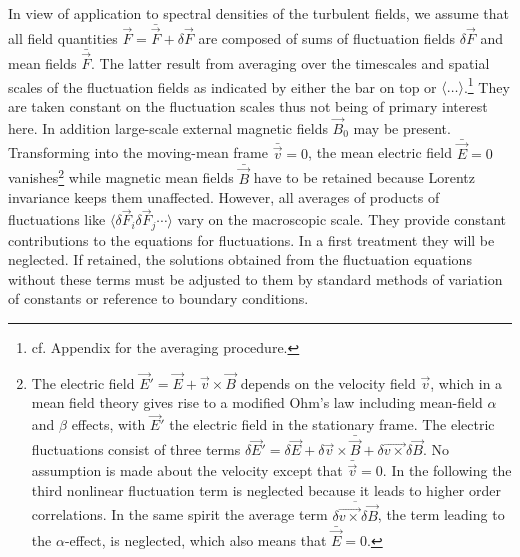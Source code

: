 \documentclass[ ]{copernicus2}
\begin{document}
{In view of application to spectral densities of the turbulent fields, we assume that all field quantities $\vec{F}=\bar{\vec{F}}+\delta\vec{F}$ are composed of sums of fluctuation fields $\delta\vec{F}$ and mean fields $\bar{\vec{F}}$. The latter result from averaging over the timescales and spatial scales of the fluctuation fields as indicated by either the bar on top or $\langle\dots\rangle$.\footnote{{cf. Appendix  for the averaging procedure.}}  They are taken constant on the fluctuation scales thus not being of primary interest here. In addition large-scale external magnetic fields $\vec{B}_0$ may be present. Transforming into the moving-mean frame $\bar{\vec{v}}=0$, the mean electric field $\bar{\vec{E}}=0$ vanishes\footnote{{The electric field $\vec{E}'=\vec{E}+\vec{v}\times\vec{B}$ depends on the velocity field $\vec{v}$, which in a mean field theory gives rise to a modified Ohm's law including mean-field $\alpha$ and $\beta$ effects, with $\vec{E}'$ the electric field in the stationary frame. The electric fluctuations consist of three terms $\delta\vec{E}'=\delta\vec{E}+\delta\vec{v}\times\bar{\vec{B}}+\delta\vec{v\times}\delta\vec{B}$. No assumption is made about the velocity except that $\bar{\vec{v}}=0$. In the following the third nonlinear fluctuation term is neglected because it leads to higher order correlations. In the same spirit the average term $\overline{\delta\vec{v\times}\delta\vec{B}}$, the term leading to the $\alpha$-effect, is neglected, which also means that $\bar{\vec{E}}=0$.}} while magnetic mean fields $\bar{\vec{B}}$ have to be retained because Lorentz invariance keeps them unaffected. However, all averages of products of fluctuations like $\langle\delta\vec{F}_i\delta\vec{F}_j\cdots\rangle$ vary on the macroscopic scale. They provide constant contributions to the equations for fluctuations. In a first treatment they will be neglected. {If retained, the solutions obtained from the fluctuation equations without these terms must be adjusted to them by standard methods of variation of constants or reference to boundary conditions.} 

}
\end{document}

